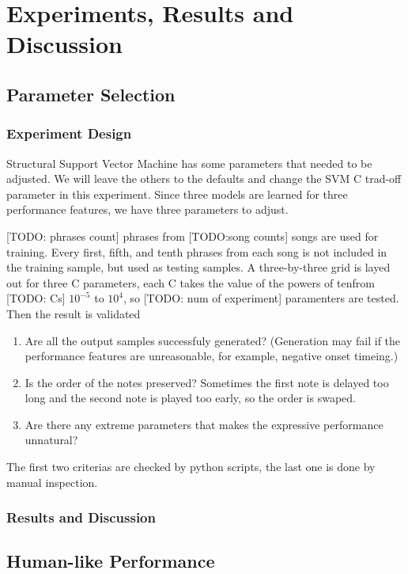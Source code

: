 \chapter{Experiments, Results and Discussion}
\section{Parameter Selection}
\subsection{Experiment Design}
Structural Support Vector Machine has some parameters that needed to be adjusted. We will leave the others to the defaults and change the SVM C trad-off parameter in this experiment. Since three models are learned for three performance features, we have three parameters to adjust. 

[TODO: phrases count] phrases from [TODO:song counts] songs are used for training. Every first, fifth, and tenth phrases from each song is not included in the training sample, but used as testing samples. A three-by-three grid is layed out for three C parameters, each C takes the value of the powers of tenfrom [TODO: Cs] $10^{-5}$ to $10^4$, so [TODO: num of experiment] paramenters are tested. Then the result is validated
\begin{enumerate}
	\item Are all the output samples successfuly generated? (Generation may fail if the performance features are unreasonable, for example, negative onset timeing.)
	\item Is the order of the notes preserved? Sometimes the first note is delayed too long and the second note is played too early, so the order is swaped.
	\item Are there any extreme parameters that makes the expressive performance unnatural?
\end{enumerate}

The first two criterias are checked by python scripts, the last one is done by manual inspection.


\subsection{Results and Discussion}

\section{Human-like Performance}
